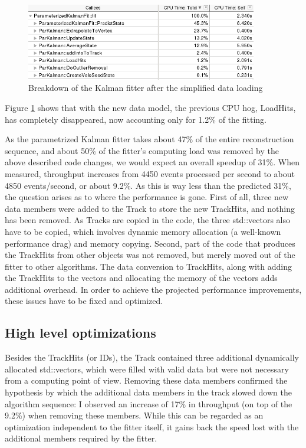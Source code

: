 \documentclass[12pt]{article}
\begin{document}
\begin{figure}[H]
	\begin{center}
		\includegraphics[width=0.9\textwidth]{kalmanfit_simplified_overall_breakdown}
	\end{center}
	\caption{Breakdown of the Kalman fitter after the simplified data loading}
	\label{fig_kalmanfit_simplified_overall_breakdown}
\end{figure}

Figure \ref{fig_kalmanfit_simplified_overall_breakdown} shows that with the new data model, the previous CPU hog, LoadHits, has completely disappeared, now accounting only for 1.2\% of the fitting.

As the parametrized Kalman fitter takes about 47\% of the entire reconstruction sequence, and about 50\% of the fitter's computing load was removed by the above described code changes, we would expect an overall speedup of 31\%. When measured, throughput increases from 4450 events processed per second to about 4850 events/second, or about 9.2\%. As this is way less than the predicted 31\%, the question arises as to where the performance is gone. First of all, three new data members were added to the Track to store the new TrackHits, and nothing has been removed. As Tracks are copied in the code, the three std::vectors also have to be copied, which involves dynamic memory allocation (a well-known performance drag) and memory copying. Second, part of the code that produces the TrackHits from other objects was not removed, but merely moved out of the fitter to other algorithms. The data conversion to TrackHits, along with adding the TrackHits to the vectors and allocating the memory of the vectors adds additional overhead. In order to achieve the projected performance improvements, these issues have to be fixed and optimized.


\subsection{High level optimizations}

Besides the TrackHits (or IDs), the Track contained three additional dynamically allocated std::vectors, which were filled with valid data but were not necessary from a computing point of view. Removing these data members confirmed the hypothesis by which the additional data members in the track slowed down the algorithm sequence: I observed an increase of 17\% in throughput (on top of the 9.2\%) when removing these members. While this can be regarded as an optimization independent to the fitter itself, it gains back the speed lost with the additional members required by the fitter.
\end{document}
